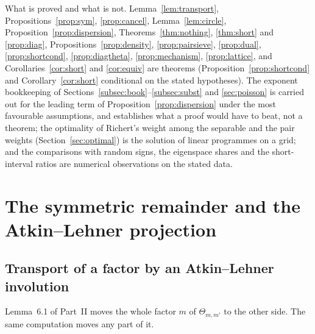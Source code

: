 \documentclass[11pt]{amsart}
\theoremstyle{remark}
\begin{document}
What is proved and what is not. Lemma~\ref{lem:transport}, Propositions~\ref{prop:sym}, \ref{prop:cancel}, Lemma~\ref{lem:circle}, Proposition~\ref{prop:dispersion}, Theorems~\ref{thm:nothing}, \ref{thm:short} and \ref{prop:diag}, Propositions~\ref{prop:density}, \ref{prop:pairsieve}, \ref{prop:dual}, \ref{prop:shortcond}, \ref{prop:diagtheta}, \ref{prop:mechanism}, \ref{prop:lattice}, and Corollaries~\ref{cor:short} and \ref{cor:equiv} are theorems (Proposition~\ref{prop:shortcond} and Corollary~\ref{cor:short} conditional on the stated hypotheses). The exponent bookkeeping of Sections~\ref{subsec:book}--\ref{subsec:subst} and \ref{sec:poisson} is carried out for the leading term of Proposition~\ref{prop:dispersion} under the most favourable assumptions, and establishes what a proof would have to beat, not a theorem; the optimality of Richert's weight among the separable and the pair weights (Section~\ref{sec:optimal}) is the solution of linear programmes on a grid; and the comparisons with random signs, the eigenspace shares and the short-interval ratios are numerical observations on the stated data.

\section{The symmetric remainder and the Atkin--Lehner projection}\label{sec:symmetric}

\subsection{Transport of a factor by an Atkin--Lehner involution}
Lemma~6.1 of Part~II moves the whole factor $m$ of $\Theta_{m,m'}$ to the other side. The same computation moves any part of it.
\end{document}
